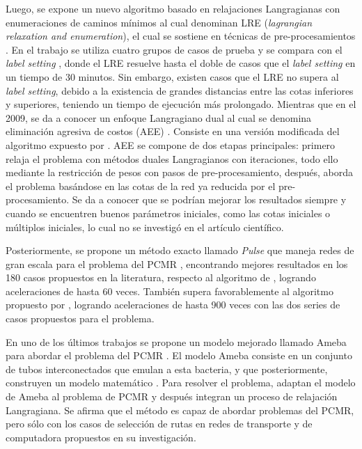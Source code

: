 Luego, se expone un nuevo algoritmo basado en relajaciones Langragianas con enumeraciones de caminos mínimos al cual denominan LRE (\textit{lagrangian relaxation and enumeration}), el cual se sostiene en técnicas de pre-procesamientos \citep{carlyle2008lagrangian}. En el trabajo se utiliza cuatro grupos de casos de prueba y se compara con el \textit{label setting} \citep{dumitrescu2003improved}, donde el LRE resuelve hasta el doble de casos que el \textit{label setting} en un tiempo de 30 minutos. Sin embargo, existen casos que el LRE no supera al \textit{label setting}, debido a la existencia de grandes distancias entre las cotas inferiores y superiores, teniendo un tiempo de ejecución más prolongado. Mientras que en el 2009, se da a conocer un enfoque Langragiano dual al cual se denomina eliminación agresiva de costos (AEE) \citep{muhandiramge2009simultaneous}. Consiste en una versión modificada del algoritmo expuesto por \citep{carlyle2008lagrangian}. AEE se compone de dos etapas principales: primero relaja el problema con métodos duales Langragianos con iteraciones, todo ello mediante la restricción de pesos con pasos de pre-procesamiento, después, aborda el problema basándose en las cotas de la red ya reducida por el pre-procesamiento. Se da a conocer que se podrían mejorar los resultados siempre y cuando se encuentren buenos parámetros iniciales, como las cotas iniciales o múltiplos iniciales, lo cual no se investigó en el artículo científico.

Posteriormente, se propone un método exacto llamado \textit{Pulse} que maneja redes de gran escala para el problema del PCMR \citep{lozano2013exact}, encontrando mejores resultados en los 180 casos propuestos en la literatura, respecto al algoritmo de \cite{santos2007improved}, logrando aceleraciones de hasta 60 veces. También supera favorablemente al algoritmo propuesto por \cite{dumitrescu2003improved}, logrando aceleraciones de hasta 900 veces con las dos series de casos propuestos para el problema.

En uno de los últimos trabajos se propone un modelo mejorado llamado Ameba para abordar el problema del PCMR \citep{zhang2013adaptive}. El modelo Ameba consiste en un conjunto de tubos interconectados que emulan a esta bacteria, y que posteriormente, construyen un modelo matemático \citep{nakagaki2001path}. Para resolver el problema, adaptan el modelo de Ameba al problema de PCMR y después integran un proceso de relajación Langragiana. Se afirma que el método es capaz de abordar problemas del PCMR, pero sólo con los casos de selección de rutas en redes de transporte y de computadora propuestos en su investigación.



